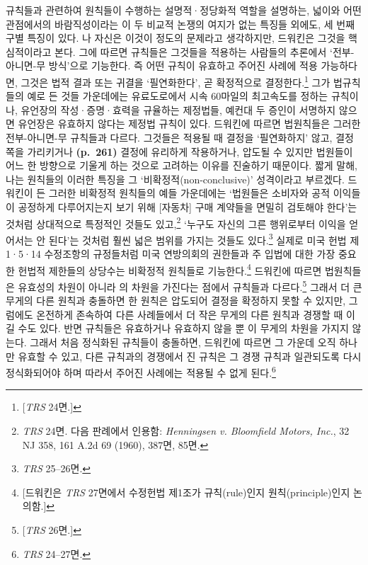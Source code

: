규칙들과 관련하여 원칙들이 수행하는 설명적·정당화적 역할을 설명하는,
넓이와 어떤 관점에서의 바람직성이라는 이 두 비교적 논쟁의 여지가 없는
특징들 외에도, 세 번째 구별 특징이 있다. 나 자신은 이것이 정도의
문제라고 생각하지만, 드워킨은 그것을 핵심적이라고 본다. 그에 따르면
규칙들은 그것들을 적용하는 사람들의 추론에서 ‘전부-아니면-무 방식’으로
기능한다. 즉 어떤 규칙이 유효하고 주어진 사례에 적용 가능하다면, 그것은
법적 결과 또는 귀결을 ‘필연화한다’, 곧 확정적으로 결정한다.\footnote{{[}\emph{TRS}
  24면.{]}} 그가 법규칙들의 예로 든 것들 가운데에는 유료도로에서 시속
60마일의 최고속도를 정하는 규칙이나, 유언장의 작성·증명·효력을 규율하는
제정법들, 예컨대 두 증인이 서명하지 않으면 유언장은 유효하지 않다는
제정법 규칙이 있다. 드워킨에 따르면 법원칙들은 그러한 전부-아니면-무
규칙들과 다르다. 그것들은 적용될 때 결정을 ‘필연화하지’ 않고, 결정 쪽을
가리키거나 \textbf{(p.~261)} 결정에 유리하게 작용하거나, 압도될 수
있지만 법원들이 어느 한 방향으로 기울게 하는 것으로 고려하는 이유를
진술하기 때문이다. 짧게 말해, 나는 원칙들의 이러한 특징을 그
‘비확정적(non-conclusive)’ 성격이라고 부르겠다. 드워킨이 든 그러한
비확정적 원칙들의 예들 가운데에는 ‘법원들은 소비자와 공적 이익들이
공정하게 다루어지는지 보기 위해 {[}자동차{]} 구매 계약들을 면밀히
검토해야 한다’는 것처럼 상대적으로 특정적인 것들도 있고,\footnote{\emph{TRS}
  24면. 다음 판례에서 인용함: \emph{Henningsen v. Bloomfield Motors,
  Inc.}, 32 NJ 358, 161 A.2d 69 (1960), 387면, 85면.} ‘누구도 자신의
그른 행위로부터 이익을 얻어서는 안 된다’는 것처럼 훨씬 넓은 범위를
가지는 것들도 있다.\footnote{\emph{TRS} 25--26면.} 실제로 미국 헌법
제1·5·14 수정조항의 규정들처럼 미국 연방의회의 권한들과 주 입법에 대한
가장 중요한 헌법적 제한들의 상당수는 비확정적 원칙들로
기능한다.\footnote{{[}드워킨은 \emph{TRS} 27면에서 수정헌법 제1조가
  규칙(rule)인지 원칙(principle)인지 논의함.{]}} 드워킨에 따르면
법원칙들은 유효성의 차원이 아니라 의 차원을 가진다는 점에서
규칙들과 다르다.\footnote{{[}\emph{TRS} 26면.{]}} 그래서 더 큰 무게의
다른 원칙과 충돌하면 한 원칙은 압도되어 결정을 확정하지 못할 수 있지만,
그럼에도 온전하게 존속하여 다른 사례들에서 더 작은 무게의 다른 원칙과
경쟁할 때 이길 수도 있다. 반면 규칙들은 유효하거나 유효하지 않을 뿐 이
무게의 차원을 가지지 않는다. 그래서 처음 정식화된 규칙들이 충돌하면,
드워킨에 따르면 그 가운데 오직 하나만 유효할 수 있고, 다른 규칙과의
경쟁에서 진 규칙은 그 경쟁 규칙과 일관되도록 다시 정식화되어야 하며
따라서 주어진 사례에는 적용될 수 없게 된다.\footnote{\emph{TRS}
  24--27면.}

